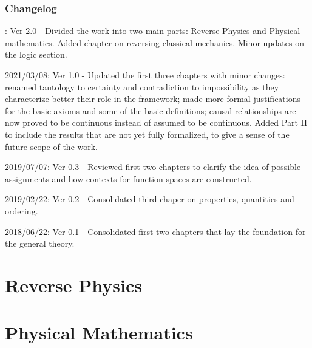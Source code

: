 \documentclass[11pt,letterpaper,fleqn]{memoir} %
\begin{document}
\section*{Changelog}

\begin{description}
	\item : Ver 2.0 - Divided the work into two main parts: Reverse Physics and Physical mathematics. Added chapter on reversing classical mechanics. Minor updates on the logic section.
	\item 2021/03/08: Ver 1.0 - Updated the first three chapters with minor changes: renamed tautology to certainty and contradiction to impossibility as they characterize better their role in the framework; made more formal justifications for the basic axioms and some of the basic definitions; causal relationships are now proved to be continuous instead of assumed to be continuous. Added Part II to include the results that are not yet fully formalized, to give a sense of the future scope of the work.
	\item 2019/07/07: Ver 0.3 - Reviewed first two chapters to clarify the idea of possible assignments and how contexts for function spaces are constructed.
	\item 2019/02/22: Ver 0.2 - Consolidated third chaper on properties, quantities and ordering.
	\item 2018/06/22: Ver 0.1 - Consolidated first two chapters that lay the foundation for the general theory.
\end{description}


\cleardoublepage %

\tableofcontents* %

\cleardoublepage %


\mainmatter

\part{Reverse Physics}





\part{Physical Mathematics}
\end{document}
